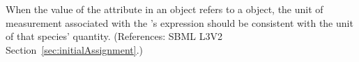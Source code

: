 When the value of the attribute  in an \InitialAssignment
object refers to a \Species object, the unit of measurement associated with
the \InitialAssignment's  expression should be consistent with
the unit of that species' quantity.  (References: SBML L3V2
Section~\ref{sec:initialAssignment}.)
